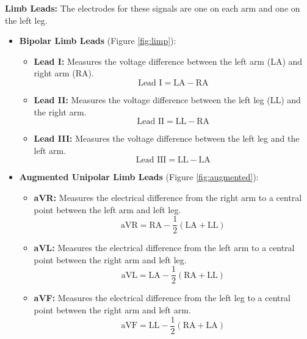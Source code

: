\documentclass{mldsmsc}
\begin{document}
\noindent \textbf{Limb Leads:} The electrodes for these signals are one on each arm and one on the left leg.
\begin{itemize}
    \item \textbf{Bipolar Limb Leads} (Figure \ref{fig:limp}):
    \begin{itemize}
        \item \textbf{Lead I:} Measures the voltage difference between the left arm (LA) and right arm (RA).
        \begin{equation}
            \text{Lead I} = \text{LA} - \text{RA}
        \end{equation}
        \item \textbf{Lead II:} Measures the voltage difference between the left leg (LL) and the right arm.
        \begin{equation}
            \text{Lead II} = \text{LL} - \text{RA}
        \end{equation}
        \item \textbf{Lead III:} Measures the voltage difference between the left leg and the left arm.
        \begin{equation}
            \text{Lead III} = \text{LL} - \text{LA}
        \end{equation}
    \end{itemize}
    \item \textbf{Augmented Unipolar Limb Leads} (Figure \ref{fig:augmented}):
    \begin{itemize}
        \item \textbf{aVR:} Measures the electrical difference from the right arm to a central point between the left arm and left leg.
        \begin{equation}
            \text{aVR} = \text{RA} - \frac{1}{2}(\text{LA} + \text{LL})
        \end{equation}
        \item \textbf{aVL:} Measures the electrical difference from the left arm to a central point between the right arm and left leg.
        \begin{equation}
            \text{aVL} = \text{LA} - \frac{1}{2}(\text{RA} + \text{LL})
        \end{equation}
        \item \textbf{aVF:} Measures the electrical difference from the left leg to a central point between the right arm and left arm.
        \begin{equation}
            \text{aVF} = \text{LL} - \frac{1}{2}(\text{RA} + \text{LA})
        \end{equation}
    \end{itemize}
\end{itemize}
\end{document}
